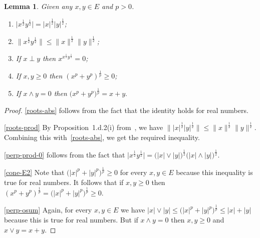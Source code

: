\documentclass[12pt]{amsart}
\theoremstyle{plain}
\newtheorem{lemma}[theorem]{Lemma}
\theoremstyle{definition}
\newcommand{\abs}[1]{\lvert#1\rvert}
\newcommand{\norm}[1]{\lVert#1\rVert}
\newcommand{\bigabs}[1]{\bigl\lvert#1\bigr\rvert}
\newcommand{\bignorm}[1]{\bigl\lVert#1\bigr\rVert}
\renewcommand{\le}{\leqslant}
\renewcommand{\ge}{\geqslant}
\def\xyroot{x^{\frac{1}{2}}{y^{\frac{1}{2}}}}
\begin{document}
\begin{lemma}\label{calc-facts}
  Given any $x,y\in E$ and $p>0$.
  \begin{enumerate}
  \item\label{roots-abs} $\bigabs{\xyroot}
     =\abs{x}^{\frac{1}{2}}\abs{y}^{\frac{1}{2}}$;
  \item\label{roots-prod} $\bignorm{\xyroot}\le
    \norm{x}^{\frac{1}{2}}\norm{y}^{\frac{1}{2}}$;
  \item\label{perp-prod-0}
  If $x\perp y$ then $x^{\xyroot}=0$;
  \item\label{cone-E2} If $x,y\ge 0$  then
    $(x^p+y^p)^{\frac{1}{p}}\ge 0$;
  \item\label{perp-osum}
  If $x\wedge y=0$ then
  \begin{math}
    \bigl(x^p+y^p\bigr)^{\frac{1}{p}}
    =x+y.
  \end{math}
  \end{enumerate}
\end{lemma}

\begin{proof}
  \eqref{roots-abs} follows from the fact that the identity holds for
  real numbers.

  \eqref{roots-prod}
  By Proposition~1.d.2(i) from~\cite{Lindenstrauss:79}, we have
  \begin{math}
    \bignorm{\abs{x}^{\frac{1}{2}}\abs{y}^{\frac{1}{2}}}\le
    \norm{x}^{\frac{1}{2}}\norm{y}^{\frac{1}{2}}.
  \end{math}
  Combining this with~\eqref{roots-abs}, we get the required inequality.

  \eqref{perp-prod-0} follows from the fact that
  \begin{math}
    \bigabs{\xyroot}=
    \bigl(\abs{x}\vee\abs{y}\bigr)^{\frac{1}{2}}
    \bigl(\abs{x}\wedge\abs{y}\bigr)^{\frac{1}{2}}.
  \end{math}

  \eqref{cone-E2} 
  Note that 
  \begin{math}
    \bigl(\abs{x}^p+\abs{y}^p\bigr)^{\frac{1}{p}}\ge 0
  \end{math}
  for every $x,y\in E$ because this inequality is true for real numbers. It
  follows that if $x,y\ge 0$ then
  \begin{math}
    (x^p+y^p)^{\frac{1}{p}}
    =\bigl(\abs{x}^p+\abs{y}^p\bigr)^{\frac{1}{p}}\ge 0.
  \end{math}

  \eqref{perp-osum}
  Again, for every $x,y\in E$ we have
  \begin{math}
    \abs{x}\vee\abs{y}\le\bigl(\abs{x}^p+\abs{y}^p\bigr)^{\frac{1}{p}}
    \le\abs{x}+\abs{y}
  \end{math}
  because this is true for real numbers. But if $x\wedge y=0$ then
  $x,y\ge 0$ and $x\vee y=x+y$.
\end{proof}
\end{document}
